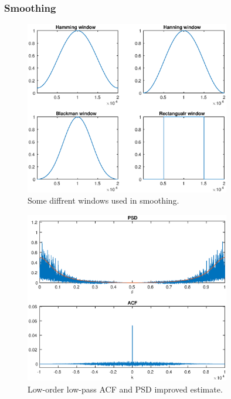 
\subsubsection{Smoothing}

\begin{figure}[h]
\centering
\includegraphics[width=0.8\textwidth]{bilder/Lab1/Lab1fig11.eps}
\caption{Some diffrent windows used in smoothing.}
\label{fig:Lab1fig11}
\end{figure}

\begin{figure}[h]
\centering
\includegraphics[width=0.8\textwidth]{bilder/Lab1/Lab1fig9.eps}
\caption{Low-order low-pass ACF and PSD improved estimate.}
\label{fig:Lab1fig9}
\end{figure}

